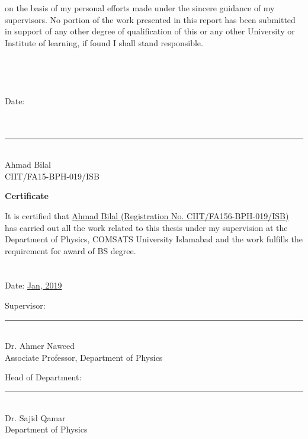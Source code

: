 \documentclass[12pt]{report}
\begin{document}
on the basis of my personal efforts made under the sincere guidance of my supervisors.
No portion of the work presented in this report has been submitted in support of any
other degree of qualification of this or any other University or Institute of learning, if
found I shall stand responsible.  \\\\\\\\\\
Date: \underline{}  \\\\\\
\begin{flushright}

	\noindent\rule{4cm}{0.4pt} \\  Ahmad Bilal \\   CIIT/FA15-BPH-019/ISB 

\end{flushright}

	
\newpage
\begin{center}
\textbf{\Large{Certificate}}\\
\end{center}
It is certified that \underline{Ahmad Bilal (Registration No. CIIT/FA156-BPH-019/ISB)} has carried out all the work related to this thesis under my supervision at the Department of Physics, COMSATS University Islamabad and the work fulfills the requirement for award of BS degree. \\\\\\
Date: \underline{Jan, 2019} 
\vspace{2.5cm}
\begin{flushright}
Supervisor: \\
\noindent\rule{4cm}{0.4pt}\\
Dr. Ahmer Naweed \\
Associate Professor, Department of Physics\\
\end{flushright}
\vspace{3cm}
Head of Department: \\
\noindent\rule{4cm}{0.4pt}\\
Dr. Sajid Qamar \\
Department of Physics
\newpage	
\end{document}
